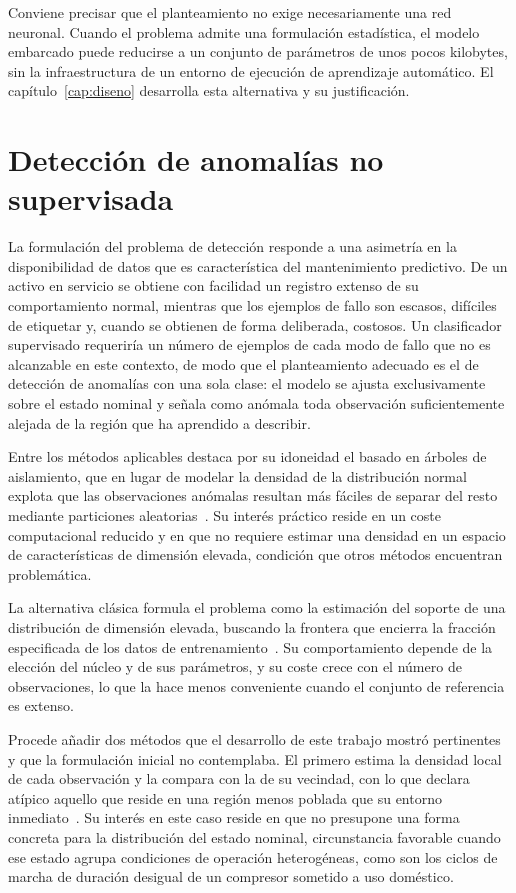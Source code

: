 Conviene precisar que el planteamiento no exige necesariamente una red neuronal. Cuando el
problema admite una formulación estadística, el modelo embarcado puede reducirse a un
conjunto de parámetros de unos pocos kilobytes, sin la infraestructura de un entorno de
ejecución de aprendizaje automático. El capítulo~\ref{cap:diseno} desarrolla esta alternativa
y su justificación.

\section{Detección de anomalías no supervisada}

La formulación del problema de detección responde a una asimetría en la disponibilidad de
datos que es característica del mantenimiento predictivo. De un activo en servicio se obtiene
con facilidad un registro extenso de su comportamiento normal, mientras que los ejemplos de
fallo son escasos, difíciles de etiquetar y, cuando se obtienen de forma deliberada, costosos.
Un clasificador supervisado requeriría un número de ejemplos de cada modo de fallo que no es
alcanzable en este contexto, de modo que el planteamiento adecuado es el de detección de
anomalías con una sola clase: el modelo se ajusta exclusivamente sobre el estado nominal y
señala como anómala toda observación suficientemente alejada de la región que ha aprendido a
describir.

Entre los métodos aplicables destaca por su idoneidad el basado en árboles de aislamiento, que
en lugar de modelar la densidad de la distribución normal explota que las observaciones
anómalas resultan más fáciles de separar del resto mediante particiones
aleatorias~\cite{liu2008}. Su interés práctico reside en un coste computacional reducido y en
que no requiere estimar una densidad en un espacio de características de dimensión elevada,
condición que otros métodos encuentran problemática.

La alternativa clásica formula el problema como la estimación del soporte de una distribución
de dimensión elevada, buscando la frontera que encierra la fracción especificada de los datos
de entrenamiento~\cite{scholkopf2001}. Su comportamiento depende de la elección del núcleo y
de sus parámetros, y su coste crece con el número de observaciones, lo que la hace menos
conveniente cuando el conjunto de referencia es extenso.

Procede añadir dos métodos que el desarrollo de este trabajo mostró pertinentes y que la
formulación inicial no contemplaba. El primero estima la densidad local de cada observación y la
compara con la de su vecindad, con lo que declara atípico aquello que reside en una región
menos poblada que su entorno inmediato~\cite{breunig2000}. Su interés en este caso reside en
que no presupone una forma concreta para la distribución del estado nominal, circunstancia
favorable cuando ese estado agrupa condiciones de operación heterogéneas, como son los ciclos
de marcha de duración desigual de un compresor sometido a uso doméstico.

